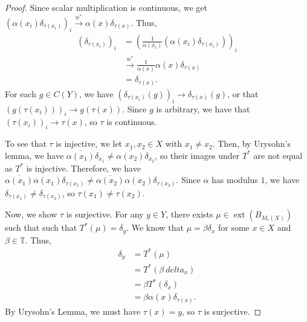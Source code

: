 \documentclass[10pt]{mypackage}
\begin{document}
\begin{proof}
  Since scalar multiplication is continuous, we get $\left( \alpha\left( x_i \right)\delta_{\tau\left( x_i \right)} \right)_i\xrightarrow{w^{\ast}}\alpha(x)\delta_{\tau(x)}$. Thus,
  \begin{align*}
    \left( \delta_{\tau\left( x_i \right)} \right)_{i} &= \left( \frac{1}{\alpha\left( x_i \right)}\left( \alpha\left( x_i \right)\delta_{\tau\left( x_i \right)} \right) \right)_{i}\\
                                                       &\xrightarrow{w^{\ast}} \frac{1}{\alpha\left( x \right)} \alpha(x)\delta_{\tau\left( x \right)}\\
                                                       &= \delta_{\tau\left( x \right)}.
  \end{align*}
  For each $g\in C(Y)$, we have $\left( \delta_{\tau\left( x_i \right)}\left( g \right) \right)_i \rightarrow \delta_{\tau(x)}(g)$, or that $\left( g\left( \tau\left( x_i \right) \right) \right)_{i}\rightarrow g\left( \tau\left( x \right) \right)$. Since $g$ is arbitrary, we have that $\left( \tau\left( x_i \right) \right)_i\rightarrow \tau\left( x \right)$, so $\tau$ is continuous.\newline

  To see that $\tau$ is injective, we let $x_1,x_2\in X$ with $x_1\neq x_2$. Then, by Urysohn's lemma, we have $\overline{\alpha\left( x_1 \right)}\delta_{x_1}\neq \overline{\alpha\left( x_2 \right)}\delta_{x_2}$, so their images under $T^{\ast}$ are not equal as $T^{\ast}$ is injective. Therefore, we have $\overline{\alpha\left( x_1 \right)}\alpha\left( x_1 \right)\delta_{\tau\left( x_1 \right)}\neq \overline{\alpha\left( x_2 \right)}\alpha\left( x_2 \right)\delta_{\tau\left( x_2 \right)}$. Since $\alpha$ has modulus $1$, we have $\delta_{\tau\left( x_1 \right)}\neq \delta_{\tau\left( x_2 \right)}$, so $\tau\left( x_1 \right)\neq \tau\left( x_2 \right)$.\newline

  Now, we show $\tau$ is surjective. For any $y\in Y$, there exists $\mu\in \operatorname{ext}\left( B_{M_r\left( X \right)} \right)$ such that such that $T^{\ast}\left( \mu \right) = \delta_{y}$. We know that $\mu = \beta \delta_x$ for some $ x\in X $ and $\beta\in \mathbb{T}$. Thus,
  \begin{align*}
    \delta_y &= T^{\ast}\left( \mu \right)\\
             &= T^{\ast}\left( \beta\ delta_x \right)\\
             &= \beta T^{\ast}\left( \delta_x \right)\\
             &= \beta \alpha(x)\delta_{\tau(x)}.
  \end{align*}
  By Urysohn's Lemma, we must have $\tau(x) = y$, so $\tau$ is surjective.\newline


\end{proof}
\end{document}
